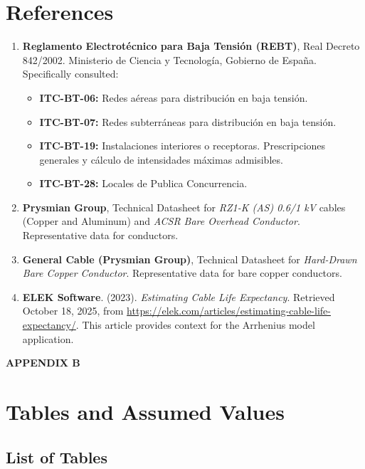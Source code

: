 \documentclass[12pt, a4paper]{article}
\begin{document}
\section{References}
\begin{enumerate}
    \item \textbf{Reglamento Electrotécnico para Baja Tensión (REBT)}, Real Decreto 842/2002. Ministerio de Ciencia y Tecnología, Gobierno de España. Specifically consulted:
    \begin{itemize}
        \item \textbf{ITC-BT-06:} Redes aéreas para distribución en baja tensión.
        \item \textbf{ITC-BT-07:} Redes subterráneas para distribución en baja tensión.
        \item \textbf{ITC-BT-19:} Instalaciones interiores o receptoras. Prescripciones generales y cálculo de intensidades máximas admisibles.
        \item \textbf{ITC-BT-28:} Locales de Publica Concurrencia.
    \end{itemize}
    
    \item \textbf{Prysmian Group}, Technical Datasheet for \textit{RZ1-K (AS) 0.6/1 kV} cables (Copper and Aluminum) and \textit{ACSR Bare Overhead Conductor}. Representative data for conductors.
    
    \item \textbf{General Cable (Prysmian Group)}, Technical Datasheet for \textit{Hard-Drawn Bare Copper Conductor}. Representative data for bare copper conductors.
    
    \item \textbf{ELEK Software}. (2023). \textit{Estimating Cable Life Expectancy}. Retrieved October 18, 2025, from \url{https://elek.com/articles/estimating-cable-life-expectancy/}. This article provides context for the Arrhenius model application.

\end{enumerate}

\begin{center}\textbf{APPENDIX B}\end{center}
\section{Tables and Assumed Values}
\subsection{List of Tables}
\listoftables
{}
\end{document}

